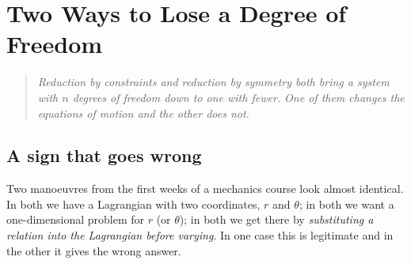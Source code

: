 \providecommand{\rdpb}[2]{\{#1,#2\}}
\providecommand{\rdDB}[2]{\{#1,#2\}_{\mathrm D}}
\providecommand{\rdwk}{\mathrel{\approx}}
\theoremstyle{definition}
\newtheorem{rdexample}{Example}[chapter]
\newtheorem{rdfact}{Fact}[chapter]
\theoremstyle{remark}
\newtheorem{rdremark}{Remark}[chapter]

\chapter{Two Ways to Lose a Degree of Freedom}\label{rd:chap}

\begin{quote}\itshape
Reduction by constraints and reduction by symmetry both bring a system with $n$ degrees of freedom down to one with fewer. One of them changes the equations of motion and the other does not.
\end{quote}

\section{A sign that goes wrong}\label{rd:sec:sign}

Two manoeuvres from the first weeks of a mechanics course look almost identical. In both we have a Lagrangian with two coordinates, $r$ and $\theta$; in both we want a one-dimensional problem for $r$ (or $\theta$); in both we get there by \emph{substituting a relation into the Lagrangian before varying}. In one case this is legitimate and in the other it gives the wrong answer.


